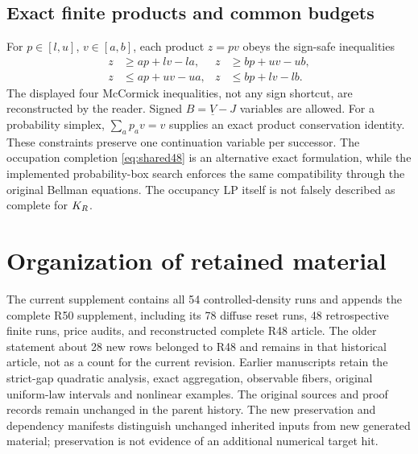\subsection{Exact finite products and common budgets}
For $p\in[l,u]$, $v\in[a,b]$, each product $z=pv$ obeys the sign-safe inequalities
\begin{align*}
 z&\ge ap+lv-la,& z&\ge bp+uv-ub,\\
 z&\le ap+uv-ua,& z&\le bp+lv-lb.
\end{align*}
The displayed four McCormick inequalities, not any sign shortcut, are reconstructed by the reader. Signed $B=\underline V-J$ variables are allowed. For a probability simplex, $\sum_a p_a v=v$ supplies an exact product conservation identity. These constraints preserve one continuation variable per successor. The occupation completion \eqref{eq:shared48} is an alternative exact formulation, while the implemented probability-box search enforces the same compatibility through the original Bellman equations. The occupancy LP itself is not falsely described as complete for $K_R$.

\section{Organization of retained material}\label{app:preserve48}
The current supplement contains all 54 controlled-density runs and appends the complete R50 supplement, including its 78 diffuse reset runs, 48 retrospective finite runs, price audits, and reconstructed complete R48 article. The older statement about 28 new rows belonged to R48 and remains in that historical article, not as a count for the current revision. Earlier manuscripts retain the strict-gap quadratic analysis, exact aggregation, observable fibers, original uniform-law intervals and nonlinear examples. The original sources and proof records remain unchanged in the parent history. The new preservation and dependency manifests distinguish unchanged inherited inputs from new generated material; preservation is not evidence of an additional numerical target hit.
